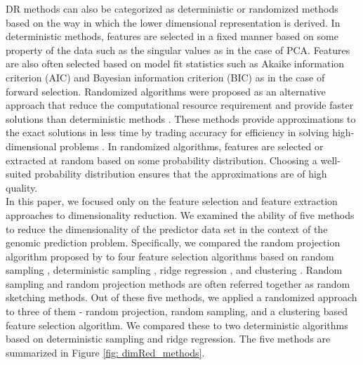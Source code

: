 DR methods can also be categorized as deterministic or randomized methods based on the way in which the lower dimensional representation is derived. In deterministic methods, features are selected in a fixed manner based on some property of the data such as the singular values as in the case of PCA. Features are also often selected based on model fit statistics such as Akaike information criterion (AIC) and Bayesian information criterion (BIC) as in the case of forward selection. Randomized algorithms were proposed as an alternative approach that reduce the computational resource requirement and provide faster solutions than deterministic methods \cite{drineas_relative-error_2008, clarkson_low-rank_2017, ailon_fast_2009, achlioptas_fast_2007, sarlos_improved_2006, liberty_randomized_2007, frieze_fast_2004, tropp_practical_2017}. These methods provide approximations to the exact solutions in less time by trading accuracy for efficiency in solving high-dimensional problems \cite{musco_power_2018}. In randomized algorithms, features are selected or extracted at random based on some probability distribution. Choosing a well-suited probability distribution ensures that the approximations are of high quality. \\

In this paper, we focused only on the feature selection and feature extraction approaches to dimensionality reduction. We examined the ability of five methods to reduce the dimensionality of the predictor data set in the context of the genomic prediction problem. Specifically, we compared the random projection algorithm proposed by \cite{ailon_fast_2009} to four feature selection algorithms based on random sampling \cite{boutsidis_improved_2009}, deterministic sampling \cite{papailiopoulos_provable_2014}, ridge regression \cite{hoerl_ridge_1970}, and clustering \cite{sneath_numerical_1973}. Random sampling and random projection methods are often referred together as random sketching methods. Out of these five methods, we applied a randomized approach to three of them - random projection, random sampling, and a clustering based feature selection algorithm. We compared these to two deterministic algorithms based on deterministic sampling and ridge regression. The five methods are summarized in Figure \ref{fig: dimRed_methods}. \\

